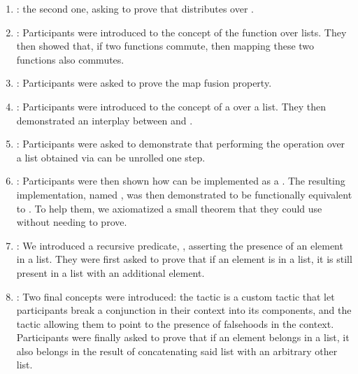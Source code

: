 \begin{enumerate}
  \item {}: the second one, asking to prove
that  distributes over .

  \item {}: Participants were introduced to the concept of
the function  over lists.  They then showed that, if two
functions commute, then mapping these two functions also commutes.

  \item {}: Participants were asked to prove the map fusion
property.

  \item {}: Participants were introduced to the concept of a
 over a list.  They then demonstrated an interplay between
 and .

  \item {}: Participants were asked to demonstrate that
performing the operation  over a list obtained via
 can be unrolled one step.

  \item {}: Participants were then shown how 
can be implemented as a .  The resulting implementation, named
, was then demonstrated to be functionally equivalent to
.  To help them, we axiomatized a small theorem that they could
use without needing to prove.

  \item {}: We introduced a recursive predicate,
, asserting the presence of an element in a list.  They were first
asked to prove that if an element is in a list, it is still present in a list
with an additional element.

  \item {}: Two final concepts were introduced: the
 tactic is a custom tactic that let participants break a
conjunction in their context into its components, and the
 tactic allowing them to point to the presence of
falsehoods in the context.  Participants were finally asked to prove that if an
element belongs in a list, it also belongs in the result of concatenating said
list with an arbitrary other list.

\end{enumerate}


